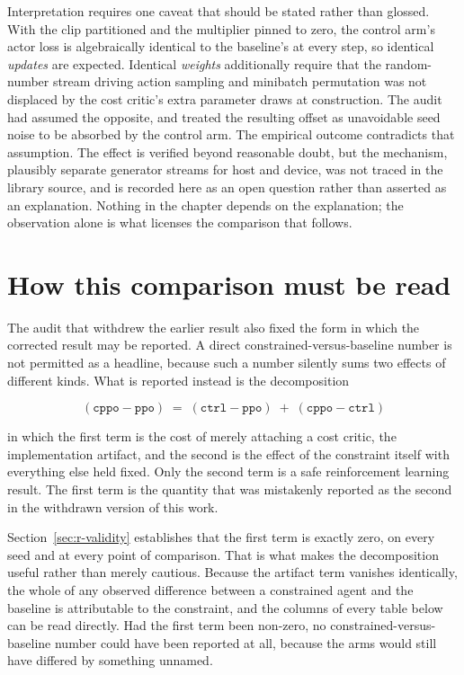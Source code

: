 Interpretation requires one caveat that should be stated rather than glossed. With the clip
partitioned and the multiplier pinned to zero, the control arm's actor loss is algebraically
identical to the baseline's at every step, so identical \emph{updates} are expected. Identical
\emph{weights} additionally require that the random-number stream driving action sampling and
minibatch permutation was not displaced by the cost critic's extra parameter draws at
construction. The audit had assumed the opposite, and treated the resulting offset as unavoidable
seed noise to be absorbed by the control arm. The empirical outcome contradicts that assumption.
The effect is verified beyond reasonable doubt, but the mechanism, plausibly separate generator
streams for host and device, was not traced in the library source, and is recorded here as an
open question rather than asserted as an explanation. Nothing in the chapter depends on the
explanation; the observation alone is what licenses the comparison that follows.

\section{How this comparison must be read}\label{sec:r-reading}

The audit that withdrew the earlier result also fixed the form in which the corrected result may
be reported. A direct constrained-versus-baseline number is not permitted as a headline, because
such a number silently sums two effects of different kinds. What is reported instead is the
decomposition

\begin{equation}
  (\mathtt{cppo} - \mathtt{ppo}) \;=\; (\mathtt{ctrl} - \mathtt{ppo}) \;+\; (\mathtt{cppo} - \mathtt{ctrl})
  \label{eq:decomposition}
\end{equation}

in which the first term is the cost of merely attaching a cost critic, the implementation
artifact, and the second is the effect of the constraint itself with everything else held fixed.
Only the second term is a safe reinforcement learning result. The first term is the quantity that
was mistakenly reported as the second in the withdrawn version of this work.

Section~\ref{sec:r-validity} establishes that the first term is exactly zero, on every seed and
at every point of comparison. That is what makes the decomposition useful rather than merely
cautious. Because the artifact term vanishes identically, the whole of any observed difference
between a constrained agent and the baseline is attributable to the constraint, and the columns
of every table below can be read directly. Had the first term been non-zero, no
constrained-versus-baseline number could have been reported at all, because the arms would still
have differed by something unnamed.

